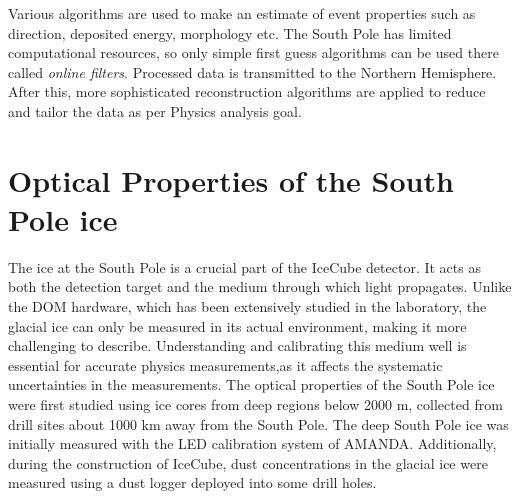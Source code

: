Various algorithms are used to make an estimate of event properties such as direction, deposited energy, morphology etc. The South Pole has limited computational resources, so only simple first guess algorithms can be used there called \emph{online filters}. Processed data is transmitted to the Northern Hemisphere. After this, more sophisticated reconstruction algorithms are applied to reduce and tailor the data as per Physics analysis goal. 


\section{Optical Properties of the South Pole ice}
The ice at the South Pole is a crucial part of the IceCube detector. It acts as both the detection target and the medium through which light propagates. Unlike the DOM hardware, which has been extensively studied in the laboratory, the glacial ice can only be measured in its actual environment, making it more challenging to describe. Understanding and calibrating this medium well is essential for accurate physics measurements,as it affects the systematic uncertainties in the measurements. The optical properties of the South Pole ice were first studied using ice cores from deep regions below 2000 m, collected from drill sites about 1000 km away from the South Pole. The deep South Pole ice was initially measured with the LED calibration system of AMANDA. Additionally, during the construction of IceCube, dust concentrations in the glacial ice were measured using a dust logger deployed into some drill holes.
\label{sec:icemodel}

